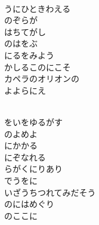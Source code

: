 \documentclass[10pt,b5j]{tarticle} %
\begin{document}
\vspace{1.5em} %
\newcommand{\linespace}{0.5em} %
\newcommand{\blocksize}{0.5\hsize} %
\newcommand{\itemmargin}{3em} %
\begin{enumerate} %
    \setlength{\itemindent}{\itemmargin} %
    \begin{minipage}[c]{\blocksize}
    
        \vspace{\linespace}
        \item~\\
        うにひときわえる\\
        のぞらが\\
        はちてがし\\
        のはをぶ\\
        にるをみよう\\
        かしるこのにこそ\\
        カペラのオリオンの\\
        よよらにえ
        
    \end{minipage}
    \begin{minipage}[c]{\blocksize}
        
        \vspace{\linespace}
        \item~\\
        をいをゆるがす\\
        のよめよ\\
        にかかる\\
        にぞなれる\\
        らがくにりあり\\
        でうをに\\
        いざうちつれてみだそう\\
        のにはめぐり\\
        のここに
    
    \end{minipage}
\end{enumerate} %
\end{document}
